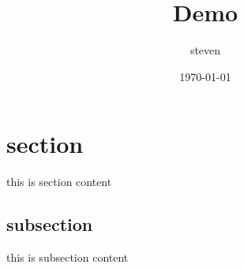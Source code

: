 \documentclass[a4paper, titlepage]{article}
\title{Demo}
\author{steven}
\date{\today}
\begin{document}
\maketitle
\tableofcontents
\section{section}
this is section content
\subsection{subsection}
this is subsection content
%
%
\end{document}
